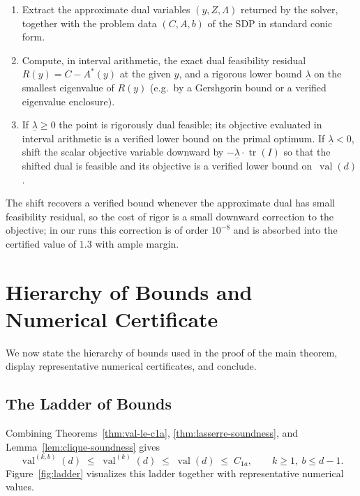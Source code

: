 \documentclass[11pt, letterpaper]{article}
\theoremstyle{paperplain}
\theoremstyle{paperdef}
\newcommand{\val}{\operatorname{val}}
\DeclareMathOperator{\tr}{tr}
\begin{document}
\begin{enumerate}
  \item Extract the approximate dual variables $(y,Z,\Lambda)$
    returned by the solver, together with the problem data $(C,A,b)$
    of the SDP in standard conic form.
  \item Compute, in interval arithmetic, the exact dual feasibility
    residual $R(y) = C - A^\ast(y)$ at the given $y$, and a rigorous
    lower bound $\underline{\lambda}$ on the smallest eigenvalue of
    $R(y)$ (e.g.\ by a Gershgorin bound or a verified eigenvalue
    enclosure).
  \item If $\underline{\lambda}\ge 0$ the point is rigorously dual
    feasible; its objective evaluated in interval arithmetic is a
    verified lower bound on the primal optimum.  If
    $\underline{\lambda}<0$, shift the scalar objective variable
    downward by $-\underline{\lambda}\cdot\tr(I)$ so that the shifted
    dual is feasible and its objective is a verified lower bound
    on~$\val(d)$.
\end{enumerate}

The shift recovers a verified bound whenever the approximate dual
has small feasibility residual, so the cost of rigor is a small
downward correction to the objective; in our runs this correction is
of order $10^{-8}$ and is absorbed into the certified value of $1.3$
with ample margin.


\section{Hierarchy of Bounds and Numerical Certificate}\label{sec:certificate}

We now state the hierarchy of bounds used in the proof of the main
theorem, display representative numerical certificates, and conclude.

\subsection{The Ladder of Bounds}

Combining Theorems~\ref{thm:val-le-c1a},
\ref{thm:lasserre-soundness}, and Lemma~\ref{lem:clique-soundness}
gives
\begin{equation}\label{eq:ladder}
  \val^{(k,b)}(d)
  \;\le\;
  \val^{(k)}(d)
  \;\le\;
  \val(d)
  \;\le\;
  C_{1a},
  \qquad k\ge 1,\ b\le d-1.
\end{equation}
Figure~\ref{fig:ladder} visualizes this ladder together with
representative numerical values.
\end{document}

